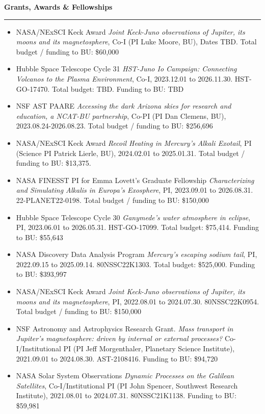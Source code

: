 \documentclass[12pt]{report}
\begin{document}
\noindent\bf{Grants, Awards \& Fellowships}\rm \hspace*{\fill} \\
\rule{\textwidth}{1pt}
\begin{itemize} \itemsep -2pt %
 \item NASA/NExSCI Keck Award {\it Joint Keck-Juno observations of Jupiter, its moons and its magnetosphere}, Co-I (PI Luke Moore, BU), Dates TBD. Total budget / funding to BU: \$60,000
 \item Hubble Space Telescope Cycle 31 {\it HST-Juno Io Campaign: Connecting Volcanos to the Plasma Environment}, Co-I, 2023.12.01 to 2026.11.30. HST-GO-17470. Total budget: TBD. Funding to BU: TBD
 \item NSF AST PAARE {\it Accessing the dark Arizona skies for research and education, a NCAT-BU partnership}, Co-PI (PI Dan Clemens, BU), 2023.08.24-2026.08.23. Total budget / funding to BU: \$256,696
 \item NASA/NExSCI Keck Award {\it Recoil Heating in Mercury's Alkali Exotail}, PI (Science PI Patrick Lierle, BU), 2024.02.01 to 2025.01.31. Total budget / funding to BU: \$13,375.
 \item NASA FINESST PI for Emma Lovett's Graduate Fellowship {\it Characterizing and Simulating Alkalis in Europa’s Exosphere}, PI, 2023.09.01 to 2026.08.31. 22-PLANET22-0198. Total budget / funding to BU: \$150,000
 \item Hubble Space Telescope Cycle 30 {\it Ganymede's water atmosphere in eclipse}, PI, 2023.06.01 to 2026.05.31. HST-GO-17099. Total budget: \$75,414. Funding to BU: \$55,643
 \item NASA Discovery Data Analysis Program {\it Mercury's escaping sodium tail}, PI, 2022.09.15 to 2025.09.14. 80NSSC22K1303. Total budget: \$525,000. Funding to BU: \$393,997
 \item NASA/NExSCI Keck Award {\it Joint Keck-Juno observations of Jupiter, its moons and its magnetosphere}, PI, 2022.08.01 to 2024.07.30. 80NSSC22K0954. Total budget / funding to BU: \$150,000
 \item NSF Astronomy and Astrophysics Research Grant. {\it Mass transport in Jupiter's magnetosphere: driven by internal or external processes?} Co-I/Institutional PI (PI Jeff Morgenthaler, Planetary Science Institute), 2021.09.01 to 2024.08.30. AST-2108416. Funding to BU: \$94,720
 \item NASA Solar System Observations {\it Dynamic Processes on the Galilean Satellites}, Co-I/Institutional PI (PI John Spencer, Southwest Research Institute), 2021.08.01 to 2024.07.31. 80NSSC21K1138. Funding to BU: \$59,981

\end{itemize}
\end{document}
